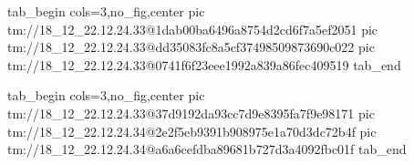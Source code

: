  
 
 
 
 

\qqSecCmtScr


\ifcmt
  tab_begin cols=3,no_fig,center
    pic tm://18_12_22.12.24.33@1dab00ba6496a8754d2cd6f7a5ef2051
    pic tm://18_12_22.12.24.33@dd35083fc8a5cf37498509873690c022
    pic tm://18_12_22.12.24.33@0741f6f23eee1992a839a86fec409519
  tab_end
\fi


\ifcmt
  tab_begin cols=3,no_fig,center
    pic tm://18_12_22.12.24.33@37d9192da93cc7d9e8395fa7f9e98171
    pic tm://18_12_22.12.24.34@2e2f5eb9391b908975e1a70d3dc72b4f
    pic tm://18_12_22.12.24.34@a6a6cefdba89681b727d3a4092fbc01f
  tab_end
\fi

